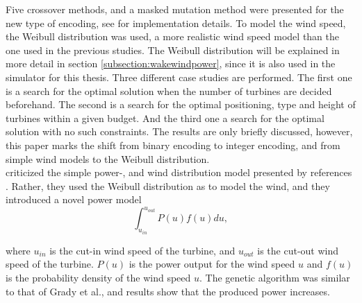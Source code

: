 \noindent Five crossover methods, and a masked mutation method were presented for the new type of encoding, see \cite{Mora} for implementation details. To model the wind speed, the Weibull distribution was used, a more realistic wind speed model than the one used in the previous studies. The Weibull distribution will be explained in more detail in section \ref{subsection:wakewindpower}, since it is also used in the simulator for this thesis. Three different case studies are performed. The first one is a search for the optimal solution when the number of turbines are decided beforehand. The second is a search for the optimal positioning, type and height of turbines within a given budget. And the third one a search for the optimal solution with no such constraints. The results are only briefly discussed, however, this paper marks the shift from binary encoding to integer encoding, and from simple wind models to the Weibull distribution.\\


\noindent \cite{Wan} criticized the simple power-, and wind distribution model presented by references \citep{Mosetti, Grady}. Rather, they used the Weibull distribution as \citep{Mora} to model the wind, and they introduced a novel power model \\


\begin{equation}
\label{Power Model (Wan)}
\int_{u_{in}}^{u_{out}} P(u)f(u) du,
\end{equation}


\noindent where $u_{in}$ is the cut-in wind speed of the turbine, and $u_{out}$ is the cut-out wind speed of the turbine. $P(u)$ is the power output for the wind speed $u$ and $f(u)$ is the probability density of the wind speed $u$. The genetic algorithm was similar to that of Grady et al., and results show that the produced power increases.\\


